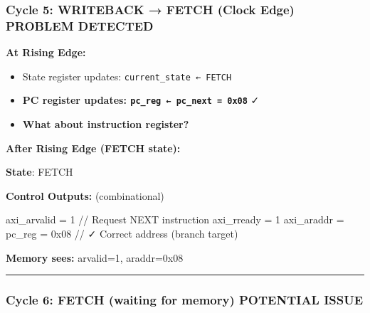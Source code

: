 \subsubsection{\texorpdfstring{Cycle 5: WRITEBACK → FETCH (Clock Edge)
\warn{} \textbf{PROBLEM
DETECTED}}{Cycle 5: WRITEBACK → FETCH (Clock Edge)  PROBLEM DETECTED}}\label{cr:fix:timing-analysis:cycle-5-writeback-fetch-clock-edge-fire-problem-detected}

\begin{record}

\textbf{At Rising Edge:}

\begin{itemize}
\tightlist
\item
  State register updates: \texttt{current\_\allowbreak{}state\ ←\ FETCH}
\item
  \textbf{PC register updates:
  \texttt{pc\_\allowbreak{}reg\ ←\ pc\_\allowbreak{}next\ =\allowbreak{}\ 0x08}}
  ✓
\item
  \textbf{What about instruction register?} \openmark{}
\end{itemize}

\textbf{After Rising Edge (FETCH state):}

\textbf{State}: FETCH

\textbf{Control Outputs:} (combinational)

\begin{textblock}
axi_arvalid = 1  // Request NEXT instruction
axi_rready  = 1
axi_araddr  = pc_reg = 0x08  // ✓ Correct address (branch target)
\end{textblock}

\textbf{Memory sees:} arvalid=1, araddr=0x08

\begin{center}\rule{0.5\linewidth}{0.5pt}\end{center}

\end{record}

\subsubsection{\texorpdfstring{Cycle 6: FETCH (waiting for memory)
\warn{} \textbf{POTENTIAL
ISSUE}}{Cycle 6: FETCH (waiting for memory)  POTENTIAL ISSUE}}\label{cr:fix:timing-analysis:cycle-6-fetch-waiting-for-memory-warning-potential-issue}

